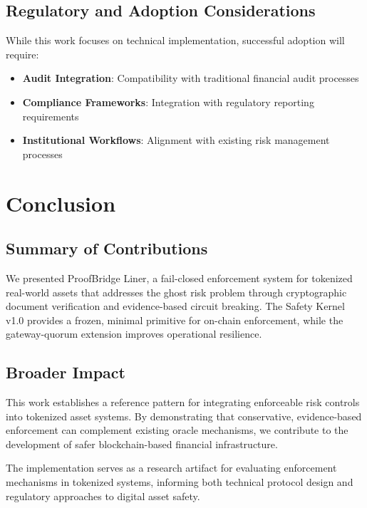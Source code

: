 \documentclass[10pt,conference]{IEEEtran}
\begin{document}
\subsection{Regulatory and Adoption Considerations}
\label{subsec:regulatory_considerations}

While this work focuses on technical implementation, successful adoption will require:

\begin{itemize}
\item \textbf{Audit Integration}: Compatibility with traditional financial audit processes
\item \textbf{Compliance Frameworks}: Integration with regulatory reporting requirements
\item \textbf{Institutional Workflows}: Alignment with existing risk management processes
\end{itemize}

\section{Conclusion}
\label{sec:conclusion}

\subsection{Summary of Contributions}
\label{subsec:summary}

We presented ProofBridge Liner, a fail-closed enforcement system for tokenized real-world assets that addresses the ghost risk problem through cryptographic document verification and evidence-based circuit breaking. The Safety Kernel v1.0 provides a frozen, minimal primitive for on-chain enforcement, while the gateway-quorum extension improves operational resilience.

\subsection{Broader Impact}
\label{subsec:broader_impact}

This work establishes a reference pattern for integrating enforceable risk controls into tokenized asset systems. By demonstrating that conservative, evidence-based enforcement can complement existing oracle mechanisms, we contribute to the development of safer blockchain-based financial infrastructure.

The implementation serves as a research artifact for evaluating enforcement mechanisms in tokenized systems, informing both technical protocol design and regulatory approaches to digital asset safety.
\end{document}
